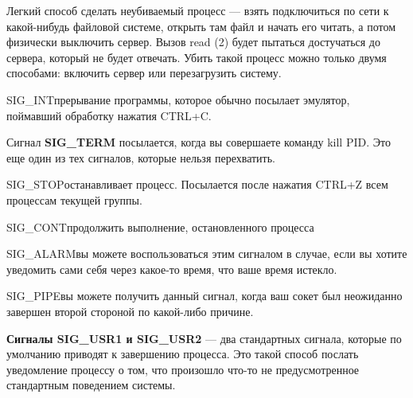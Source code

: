 Легкий способ сделать неубиваемый процесс --- взять подключиться по сети к какой-нибудь файловой системе, открыть там файл и начать его читать, а потом физически выключить сервер. Вызов read (2) будет пытаться достучаться до сервера, который не будет отвечать. Убить такой процесс можно только двумя способами: включить сервер или перезагрузить систему. 

\begin{myenv}{SIG\_INT}{прерывание программы, которое обычно посылает эмулятор, поймавший обработку нажатия CTRL+C.}
\end{myenv}

Сигнал \textbf{SIG\_TERM} посылается, когда вы совершаете команду kill PID. Это еще один из тех сигналов, которые нельзя перехватить.

\begin{myenv}{SIG\_STOP}{останавливает процесс. Посылается после нажатия CTRL+Z всем процессам текущей группы. }
\end{myenv}

\begin{myenv}{SIG\_CONT}{продолжить выполнение, остановленного процесса}
\end{myenv}

\begin{myenv}{SIG\_ALARM}{вы можете воспользоваться этим сигналом в случае, если вы хотите уведомить сами себя через какое-то время, что ваше время истекло.}
\end{myenv}

\begin{myenv}{SIG\_PIPE}{вы можете получить данный сигнал, когда ваш сокет был неожиданно завершен второй стороной по какой-либо причине.}
\end{myenv}

\textbf{Сигналы SIG\_USR1 и SIG\_USR2} --- два стандартных сигнала, которые по умолчанию приводят к завершению процесса. Это такой способ послать уведомление процессу о том, что произошло что-то не предусмотренное стандартным поведением системы. 
